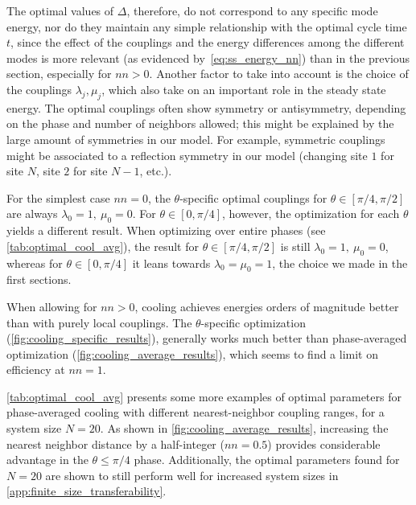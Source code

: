 \documentclass[aps,prx,twocolumn,superscriptaddress,nofootinbib,nolongbibliography,nobalancelastpage,10pt,floatfix]{revtex4-2}
\begin{document}
The optimal values of $\Delta$, therefore, do not correspond to any specific mode energy, nor do they maintain any simple relationship with the optimal cycle time $t$, since the effect of the couplings and the energy differences among the different modes is more relevant (as evidenced by~\cref{eq:ss_energy_nn}) than in the previous section, especially for $nn>0$. Another factor to take into account is the choice of the couplings $\lambda_j, \mu_j$, which also take on an important role in the steady state energy. The optimal couplings often show symmetry or antisymmetry, depending on the phase and number of neighbors allowed; this might be explained by the large amount of symmetries in our model. For example, symmetric couplings might be associated to a reflection symmetry in our model (changing site $1$ for site $N$, site $2$ for site $N-1$, etc.).

For the simplest case $nn=0$, the $\theta$-specific optimal couplings for $\theta\in[\pi/4,\pi/2]$ are always $\lambda_0=1,\ \mu_0=0$. For $\theta\in[0,\pi/4]$, however, the optimization for each $\theta$ yields a different result. When optimizing over entire phases (see \cref{tab:optimal_cool_avg}), the result for $\theta\in[\pi/4,\pi/2]$ is still $\lambda_0=1,\ \mu_0=0$, whereas for $\theta\in[0,\pi/4]$ it leans towards $\lambda_0=\mu_0=1$, the choice we made in the first sections.

When allowing for $nn>0$, cooling achieves energies orders of magnitude better than with purely local couplings. The $\theta$-specific optimization (\cref{fig:cooling_specific_results}), generally works much better than phase-averaged optimization (\cref{fig:cooling_average_results}), which seems to find a limit on efficiency at $nn=1$.

\cref{tab:optimal_cool_avg} presents some more examples of optimal parameters for phase-averaged cooling with different nearest-neighbor coupling ranges, for a system size $N=20$. As shown in \cref{fig:cooling_average_results}, increasing the nearest neighbor distance by a half-integer ($nn=0.5$) provides considerable advantage in the $\theta \leq \pi/4$ phase. Additionally, the optimal parameters found for $N=20$ are shown to still perform well for increased system sizes in \cref{app:finite_size_transferability}.
\end{document}
